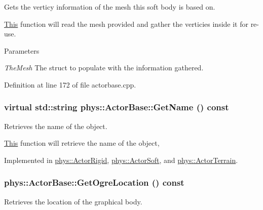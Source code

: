 Gets the verticy information of the mesh this soft body is based on. 

\hyperlink{structThis}{This} function will read the mesh provided and gather the verticies inside it for re-\/use. 
\begin{DoxyParams}{Parameters}
\item[{\em TheMesh}]The struct to populate with the information gathered. \end{DoxyParams}


Definition at line 172 of file actorbase.cpp.

\hypertarget{classphys_1_1ActorBase_a8309f5bd133c936abe3a856b0240159f}{
\subsubsection[{GetName}]{\setlength{\rightskip}{0pt plus 5cm}virtual std::string phys::ActorBase::GetName () const}}
\label{d8/d0f/classphys_1_1ActorBase_a8309f5bd133c936abe3a856b0240159f}


Retrieves the name of the object. 

\hyperlink{structThis}{This} function will retrieve the name of the object, 

Implemented in \hyperlink{classphys_1_1ActorRigid_a63952e0b7ab7176ae60d96756dd84b43}{phys::ActorRigid}, \hyperlink{classphys_1_1ActorSoft_a2b6bc680d900626275dc5eb3b631acca}{phys::ActorSoft}, and \hyperlink{classphys_1_1ActorTerrain_a08f306ae189e55d780dcaa2c43d7b6eb}{phys::ActorTerrain}.

\hypertarget{classphys_1_1ActorBase_a12ef0a2625e2fdf506ea8e23e0a378fa}{
\subsubsection[{GetOgreLocation}]{ phys::ActorBase::GetOgreLocation () const}}
\label{d8/d0f/classphys_1_1ActorBase_a12ef0a2625e2fdf506ea8e23e0a378fa}


Retrieves the location of the graphical body. 

